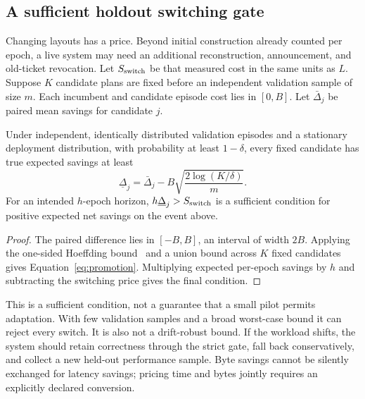 \documentclass[11pt]{article}
\theoremstyle{definition}\newtheorem{definition}[theorem]{Definition}
\theoremstyle{remark}\newtheorem{remark}[theorem]{Remark}
\begin{document}
\subsection{A sufficient holdout switching gate}
Changing layouts has a price. Beyond initial construction already counted per epoch, a live system may need an additional reconstruction, announcement, and old-ticket revocation. Let $S_{\rm switch}$ be that measured cost in the same units as $L$. Suppose $K$ candidate plans are fixed before an independent validation sample of size $m$. Each incumbent and candidate episode cost lies in $[0,B]$. Let $\bar\Delta_j$ be paired mean savings for candidate $j$.

\begin{proposition}\label{prop:promotion}
Under independent, identically distributed validation episodes and a stationary deployment distribution, with probability at least $1-\delta$, every fixed candidate has true expected savings at least
\begin{equation}\label{eq:promotion}
 \underline\Delta_j=\bar\Delta_j-B\sqrt{\frac{2\log(K/\delta)}{m}}.
\end{equation}
For an intended $h$-epoch horizon, $h\underline\Delta_j>S_{\rm switch}$ is a sufficient condition for positive expected net savings on the event above.
\end{proposition}
\begin{proof}
The paired difference lies in $[-B,B]$, an interval of width $2B$. Applying the one-sided Hoeffding bound~\cite{hoeffding} and a union bound across $K$ fixed candidates gives Equation~\eqref{eq:promotion}. Multiplying expected per-epoch savings by $h$ and subtracting the switching price gives the final condition.\end{proof}

This is a sufficient condition, not a guarantee that a small pilot permits adaptation. With few validation samples and a broad worst-case bound it can reject every switch. It is also not a drift-robust bound. If the workload shifts, the system should retain correctness through the strict gate, fall back conservatively, and collect a new held-out performance sample. Byte savings cannot be silently exchanged for latency savings; pricing time and bytes jointly requires an explicitly declared conversion.
\end{document}
